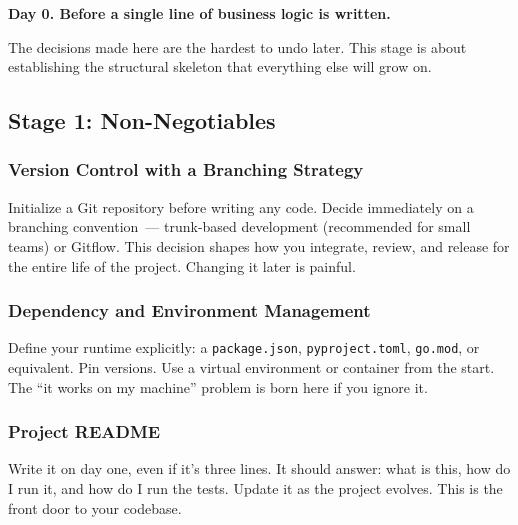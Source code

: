 \label{writing-good-code:stage-1--project-foundation}

\begin{notebox}

\textbf{Day 0. Before a single line of business logic is written.}

\end{notebox}

\noindent{}The decisions made here are the hardest to undo later. This stage is about establishing the structural skeleton that everything else will grow on.

\subsection*{Stage 1: Non-Negotiables}\label{writing-good-code:stage-1-non-negotiables}

\subsubsection*{Version Control with a Branching Strategy}\label{writing-good-code:version-control-with-a-branching-strategy}

Initialize a Git repository before writing any code. Decide immediately on a branching convention~--- trunk-based development (recommended for small teams) or Gitflow. This decision shapes how you integrate, review, and release for the entire life of the project. Changing it later is painful.

\subsubsection*{Dependency and Environment Management}\label{writing-good-code:dependency-and-environment-management}

Define your runtime explicitly: a \texttt{package.json}, \texttt{pyproject.toml}, \texttt{go.mod}, or equivalent. Pin versions. Use a virtual environment or container from the start. The ``it works on my machine'' problem is born here if you ignore it.

\subsubsection*{Project README}\label{writing-good-code:project-readme}

Write it on day one, even if it's three lines. It should answer: what is this, how do I run it, and how do I run the tests. Update it as the project evolves. This is the front door to your codebase.

